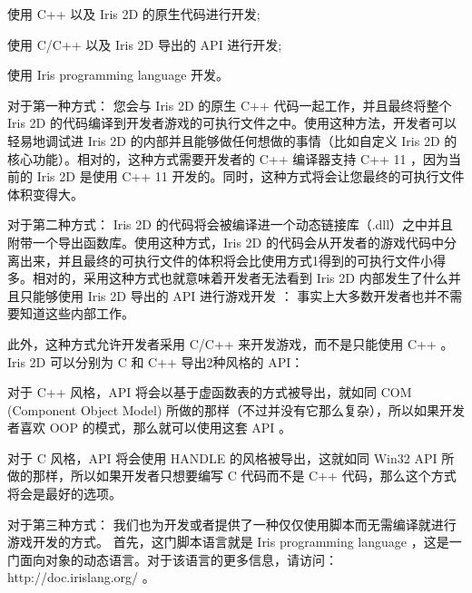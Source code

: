 \begin{DoxyItemize}
\item 使用 C++ 以及 Iris 2D 的原生代码进行开发; \item 使用 C/\+C++ 以及 Iris 2D 导出的 A\+PI 进行开发; \item 使用 Iris programming language 开发。\end{DoxyItemize}
\begin{DoxyParagraph}{对于第一种方式：}
您会与 Iris 2D 的原生 C++ 代码一起工作，并且最终将整个 Iris 2D 的代码编译到开发者游戏的可执行文件之中。使用这种方法，开发者可以轻易地调试进 Iris 2D 的内部并且能够做任何想做的事情（比如自定义 Iris 2D 的核心功能）。相对的，这种方式需要开发者的 C++ 编译器支持 C++ 11 ，因为当前的 Iris 2D 是使用 C++ 11 开发的。同时，这种方式将会让您最终的可执行文件体积变得大。 
\end{DoxyParagraph}
\begin{DoxyParagraph}{对于第二种方式：}
Iris 2D 的代码将会被编译进一个动态链接库（.\+dll）之中并且附带一个导出函数库。使用这种方式，\+Iris 2D 的代码会从开发者的游戏代码中分离出来，并且最终的可执行文件的体积将会比使用方式1得到的可执行文件小得多。相对的，采用这种方式也就意味着开发者无法看到 Iris 2D 内部发生了什么并且只能够使用 Iris 2D 导出的 A\+PI 进行游戏开发 ： 事实上大多数开发者也并不需要知道这些内部工作。 
\end{DoxyParagraph}
\begin{DoxyParagraph}{}
此外，这种方式允许开发者采用 C/\+C++ 来开发游戏，而不是只能使用 C++ 。\+Iris 2D 可以分别为 C 和 C++ 导出2种风格的 A\+P\+I： 
\end{DoxyParagraph}
\begin{DoxyParagraph}{}
\begin{DoxyItemize}
\item 对于 C++ 风格，\+A\+PI 将会以基于虚函数表的方式被导出，就如同 C\+OM (Component Object Model) 所做的那样（不过并没有它那么复杂），所以如果开发者喜欢 O\+OP 的模式，那么就可以使用这套 A\+PI 。 \item 对于 C 风格，\+A\+PI 将会使用 H\+A\+N\+D\+LE 的风格被导出，这就如同 Win32 A\+PI 所做的那样，所以如果开发者只想要编写 C 代码而不是 C++ 代码，那么这个方式将会是最好的选项。\end{DoxyItemize}

\end{DoxyParagraph}
\begin{DoxyParagraph}{对于第三种方式：}
我们也为开发或者提供了一种仅仅使用脚本而无需编译就进行游戏开发的方式。 首先，这门脚本语言就是 Iris programming language ，这是一门面向对象的动态语言。对于该语言的更多信息，请访问：http\+://doc.irislang.\+org/ 。 
\end{DoxyParagraph}
